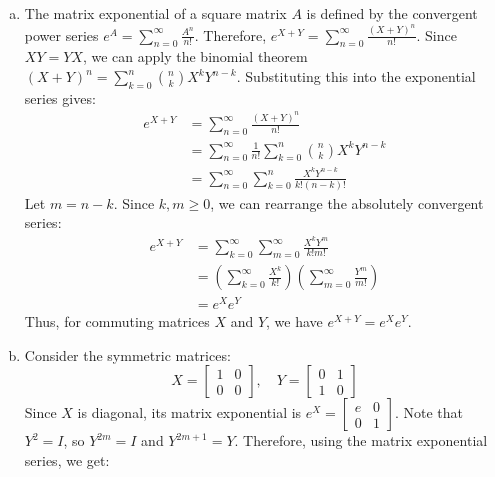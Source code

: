 \documentclass[11pt,a4paper,margin=1in]{article}
\begin{document}
\section{}
\begin{enumerate}[(a)]
    \item The matrix exponential of a square matrix $A$ is defined by the
    convergent power series $e^A = \sum_{n=0}^{\infty} \frac{A^n}{n!}$. Therefore,
    $e^{X + Y} = \sum_{n=0}^{\infty} \frac{(X + Y)^n}{n!}$. Since $XY = YX$, we
    can apply the binomial theorem $(X + Y)^n = \sum_{k=0}^{n} \binom{n}{k} X^k Y^{n-k}$. 
    Substituting this into the exponential series gives:
    \begin{align*}
        e^{X + Y} &= \sum_{n=0}^{\infty} \frac{(X + Y)^n}{n!} \\
        &= \sum_{n=0}^{\infty} \frac{1}{n!} \sum_{k=0}^{n} \binom{n}{k} X^k Y^{n-k} \\
        &= \sum_{n=0}^{\infty} \sum_{k=0}^{n} \frac{X^k Y^{n-k}}{k! (n-k)!}
    \end{align*}
    Let $m = n - k$. Since $k, m \geq 0$, we can rearrange the absolutely convergent
    series:
    \begin{align*}
        e^{X + Y} &= \sum_{k=0}^{\infty} \sum_{m=0}^{\infty} \frac{X^k Y^m}{k! m!} \\
        &= \left(\sum_{k=0}^{\infty} \frac{X^k}{k!}\right) \left(\sum_{m=0}^{\infty} \frac{Y^m}{m!}\right) \\
        &= e^X e^Y
    \end{align*}
    Thus, for commuting matrices $X$ and $Y$, we have $e^{X + Y} = e^X e^Y$.
    \item Consider the symmetric matrices:
    \[
        X = \begin{bmatrix}
            1 & 0 \\
            0 & 0
        \end{bmatrix}, \quad
        Y = \begin{bmatrix}
            0 & 1 \\
            1 & 0   
        \end{bmatrix}
    \]
    Since $X$ is diagonal, its matrix exponential is $e^X = \begin{bmatrix}
        e & 0 \\
        0 & 1
    \end{bmatrix}$. Note that $Y^2 = I$, so $Y^{2m} = I$ and $Y^{2m+1} = Y$. Therefore,
    using the matrix exponential series, we get:
    \begin{align*}

\end{align*}
\end{enumerate}
\end{document}
